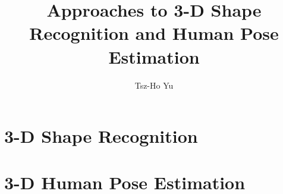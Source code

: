 \documentclass[a4paper, 12pt]{class/thyuthesis}
\title{Approaches to 3-D Shape Recognition and Human Pose Estimation}
\author{Tsz-Ho Yu}
\begin{document}
\maketitle

\setcounter{secnumdepth}{3}
\setcounter{tocdepth}{3}

\frontmatter
{}




\tableofcontents \newpage
\listoffigures \newpage
\listoftables

\mainmatter

\part{3-D Shape Recognition}







\part{3-D Human Pose Estimation}








\backmatter
\appendix



\renewcommand{\bibname}{References} 
 
\end{document}

